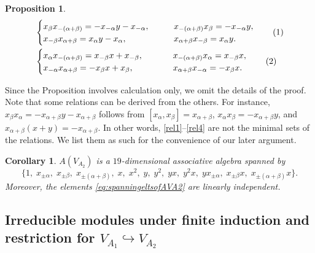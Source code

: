 \documentclass[12pt,a4paper,reqno]{amsart}
\numberwithin{equation}{section}
\numberwithin{equation}{section}
\newtheorem{prop}[thm]{Proposition}
\newtheorem{coro}[thm]{Corollary}
\newcommand\numberthis{\addtocounter{equation}{1}\tag{\theequation}}
\theoremstyle{definition}
\def \al{\alpha}
\def\hr{\hookrightarrow}
\def \b {\beta}
\begin{document}
\begin{prop}
\begin{align*}
			&\begin{cases}
				x_\b x_{-(\al+\b)}=-x_{-\al}y-x_{-\al}, \quad \ \ \ &	x_{-(\al+\b)}x_\b=-x_{-\al}y,\\
				x_{-\b}x_{\al+\b}=x_{\al}y-x_\al,&	x_{\al+\b}x_{-\b}=x_{\al}y.
			\end{cases}\numberthis\label{eq:morerel2}\\
			&\begin{cases}
				x_\al x_{-(\al+\b)}=x_{-\b}x+x_{-\b},\qquad \ \ & x_{-(\al+\b)}x_\al=x_{-\b}x,\\
				x_{-\al}x_{\al+\b}=-x_{\b}x+x_\b,& x_{\al+\b}x_{-\al}=-x_{\b}x. 
			\end{cases}\numberthis\label{eq:morerel3}
		\end{align*}
	\end{prop}
	Since the Proposition involves calculation only, we omit the details of the proof. 
	Note that some relations can be derived from the others. For instance, $ x_\b x_\al=-x_{\al+\b}y-x_{\al+\b}$ follows  from $[x_\al,x_\b]=x_{\al+\b}$, $ x_\al x_\b=-x_{\al+\b}y$, and $ x_{\al+\b}(x+y)=-x_{\al+\b}$. In other words,  \eqref{rel1}--\eqref{rel4} are not the minimal sets of the relations. We list them as such for the convenience of our later argument. %
	
	\begin{coro}\label{coro:basisofAVA2}
		$A(V_{A_2})$ is a $19$-dimensional associative algebra spanned by 
		\begin{equation}\label{eq:spanningeltsofAVA2}
			\{1,\; x_{\pm \alpha},\; x_{\pm \beta},\; x_{\pm (\alpha+\beta)},\; x,\; x^2,\; y,\; y^2,\; yx,\;  y^2x,\; yx_{\pm \alpha},\; x_{\pm \beta}x,\; x_{\pm (\alpha+\beta)}x\}.
		\end{equation}
		Moreover, the elements \eqref{eq:spanningeltsofAVA2} are linearly independent. 
	\end{coro}
	
	
	
	
	
	\subsection{Irreducible modules under finite induction and restriction for $V_{A_1}\hr V_{A_2}$}
	
\end{document}
